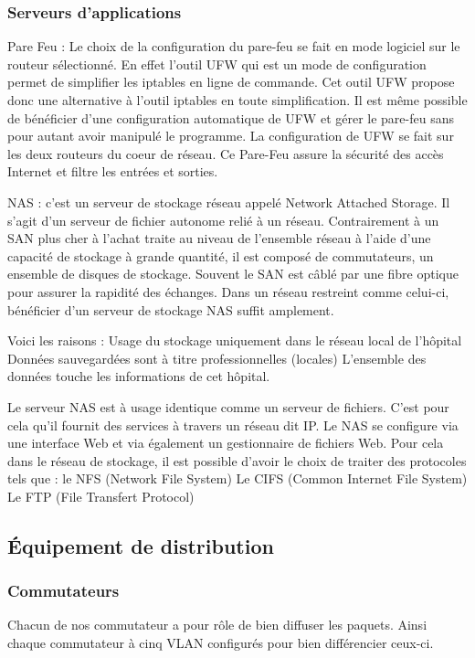 %
\subsubsection{Serveurs d'applications}

Pare Feu :
Le choix de la configuration du pare-feu se fait en mode logiciel sur le routeur sélectionné.
En effet l'outil UFW qui est un mode de configuration permet de simplifier les iptables en ligne de commande.
Cet outil UFW propose donc une alternative à l'outil iptables en toute simplification.
Il est même possible de bénéficier d'une configuration automatique de UFW et gérer le pare-feu sans pour autant avoir manipulé le programme.
La configuration de UFW se fait sur les deux routeurs du coeur de réseau. Ce Pare-Feu assure la sécurité des accès Internet et filtre les entrées et sorties.

NAS :
c'est un serveur de stockage réseau appelé Network Attached Storage. Il s'agit d'un serveur de fichier autonome relié à un réseau. Contrairement à un SAN plus cher à l'achat traite au niveau de l'ensemble réseau à l'aide d'une capacité de stockage à grande quantité, il est  composé de commutateurs, un ensemble  de disques de stockage. Souvent le SAN est câblé par une fibre optique pour assurer la rapidité des échanges.
Dans un réseau restreint comme celui-ci, bénéficier d'un serveur de stockage NAS suffit amplement.

Voici les raisons :
Usage du stockage uniquement dans le réseau local de l'hôpital
Données sauvegardées sont à titre professionnelles (locales)
L'ensemble des données touche les informations de cet hôpital.

Le serveur NAS est à usage identique comme un serveur de fichiers. C'est pour cela qu'il fournit des services à travers un réseau dit IP.  Le NAS se configure via une interface Web  et via également un gestionnaire de fichiers Web.
Pour cela dans le réseau de stockage, il est possible d'avoir le choix de traiter des protocoles tels que :
le NFS (Network File System)
Le CIFS (Common Internet File System)
Le FTP (File Transfert Protocol)


%
%
\subsection{Équipement de distribution}

%
\subsubsection{Commutateurs}
Chacun de nos commutateur a pour rôle de bien diffuser les paquets. Ainsi chaque commutateur à cinq VLAN configurés pour bien différencier ceux-ci.

